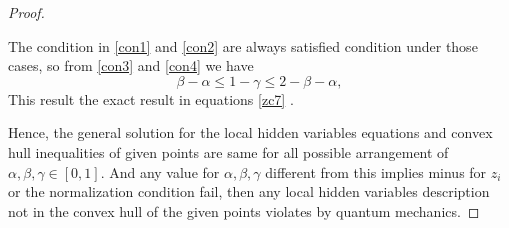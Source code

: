 \begin{proof}
\begin{itemize}
The condition in \ref{con1} and \ref{con2} are  always satisfied condition under those cases, so from \ref{con3} and \ref{con4} we have
\begin{equation}
\beta-\alpha \leq 1-\gamma \leq 2-\beta-\alpha, 
\end{equation}
This result the exact result in equations \ref{zc7} .
\end{itemize}
Hence, the general solution for the local hidden variables equations  and convex hull inequalities of given points are same for  all possible arrangement of $\alpha, \beta , \gamma \in [0,1]$. And any value for $\alpha, \beta , \gamma$ different from this implies minus for $z_i$ or the normalization condition fail, then any local hidden variables description not in the convex hull of the given points violates by  quantum mechanics.
\end{proof}